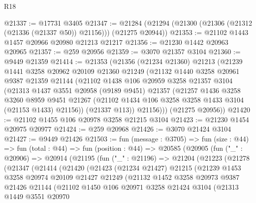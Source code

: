 \begin{lexlean}{R18}
\begin{coremodule}
@21337 := @17731 @3405
@21347 := @21284 (@21294 (@21300 (@21306 (@21312 (@21336 (@21337 @50)) @21156))) (@21275 @20944))
@21353 := @21102 @1443 @1457 @20966 @20980 @21213 @21217
@21356 := @21230 @1442 @20963 @20965
@21357 := @259 @20956
@21359 := @3070 @21357 @3104
@21360 := @9449 @21359
@21414 := @21353
    (@21356
      (@21234 @21360)
      @21213
      (@21239
        @1441
        @3258
        @20962
        @20109
        @21360
        @21249
        (@21132
          @1440
          @3258
          @20961
          @9387
          @21359
          @21144
          (@21102
            @1438
            @106
            @20959
            @3258
            @21357
            @3104
            (@21313
              @1437
              @3551
              @20958
              (@9189 @9451)
              @21357
              (@21257
                @1436
                @3258
                @3260
                @8959
                @9451
                @21267
                (@21102 @1434 @106 @3258 @3258 @1433 @3104 (@21153 @1433) @21156))
              (@21337 @113))
            @21156)))
      (@21275 @20956))
@21420 := @21102 @1455 @106 @20978 @3258 @21215 @3104
@21423 := @21230 @1454 @20975 @20977
@21424 := @259 @20968
@21426 := @3070 @21424 @3104
@21427 := @9449 @21426
@21503 := fun (message : @3705) =>
  fun (size : @44) =>
  fun (total : @44) =>
  fun (position : @44) =>
  @20585
    (@20905
      (fun ("_" : @20906) =>
      @20914
        (@21195
          (fun ("_" : @21196) =>
          @21204
            (@21223
              (@21278
                (@21347
                  (@21414
                    (@21420
                      (@21423
                        (@21234 @21427)
                        @21215
                        (@21239
                          @1453
                          @3258
                          @20974
                          @20109
                          @21427
                          @21249
                          (@21132
                            @1452
                            @3258
                            @20973
                            @9387
                            @21426
                            @21144
                            (@21102
                              @1450
                              @106
                              @20971
                              @3258
                              @21424
                              @3104
                              (@21313
                                @1449
                                @3551
                                @20970

\end{coremodule}
\end{lexlean}
